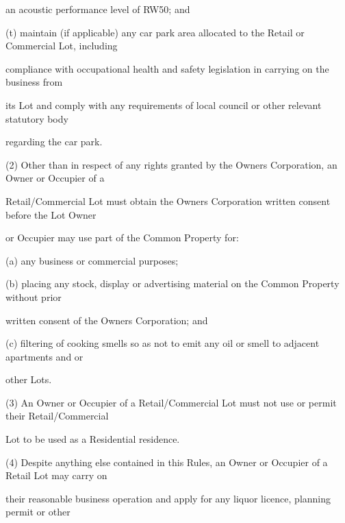 \documentclass{article}
\begin{document}
{\fontsize{10.02}{1}an acoustic performance level of RW50; and }

{\fontsize{9.962}{1}(t) maintain (if applicable) any car park area allocated to the Retail or Commercial Lot, including }

{\fontsize{10.02}{1}compliance with occupational health and safety legislation in carrying on the business from }

{\fontsize{10.02}{1}its Lot and comply with any requirements of local council or other relevant statutory body }

{\fontsize{10.02}{1}regarding the car park. }

{\fontsize{9.962}{1}(2) Other than in respect of any rights granted by the Owners Corporation, an Owner or Occupier of a }

{\fontsize{10.02}{1}Retail/Commercial Lot must obtain the Owners Corporation written consent before the Lot Owner }

{\fontsize{10.02}{1}or Occupier may use part of the Common Property for: }

\newpage


















{\fontsize{9.962}{1}(a) any business or commercial purposes; }

{\fontsize{9.962}{1}(b) placing any stock, display or advertising material on the Common Property without prior }

{\fontsize{10.02}{1}written consent of the Owners Corporation; and }

{\fontsize{9.962}{1}(c) filtering of cooking smells so as not to emit any oil or smell to adjacent apartments and or }

{\fontsize{10.02}{1}other Lots. }

{\fontsize{9.962}{1}(3) An Owner or Occupier of a Retail/Commercial Lot must not use or permit their Retail/Commercial }

{\fontsize{10.02}{1}Lot to be used as a Residential residence. }

{\fontsize{9.962}{1}(4) Despite anything else contained in this Rules, an Owner or Occupier of a Retail Lot may carry on }

{\fontsize{10.02}{1}their reasonable business operation and apply for any liquor licence, planning permit or other }
\end{document}
